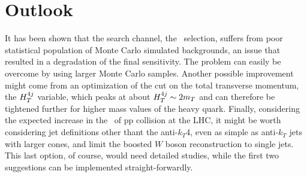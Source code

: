 \section{Outlook}\label{sec:wbxOUT}

It has been shown that the search channel, the \tight\ selection,
suffers from poor statistical population of Monte Carlo simulated
backgrounds, an issue that resulted in a degradation
of the final sensitivity. The problem can easily be overcome by
using larger Monte Carlo samples. Another possible improvement
might come from an optimization of the cut on the total transverse
momentum, the $\htfj$ variable, which peaks at about $\htfj\sim 2m_T$
and can therefore be tightened further for higher mass values of the
heavy quark. Finally, considering the expected increase in the
\cme\ of pp collision at the LHC, it might be worth considering 
jet definitions other thant the anti-$k_T$4, even as simple as
anti-$k_T$ jets with larger cones, and limit the boosted $W$
boson reconstruction to single jets. This last option, of course,
would need detailed studies, while the first two suggestions
can be implemented straight-forwardly.
